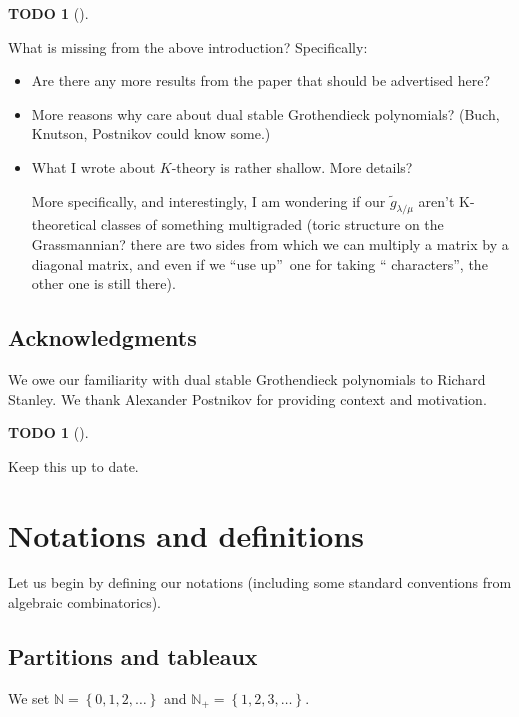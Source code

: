 \documentclass[numbers=enddot,12pt,final,onecolumn,notitlepage]{scrartcl}%
\theoremstyle{definition}
\newtheorem{quest}[theo]{TODO}
\newenvironment{todo}[1][]
{\begin{quest}[#1]\begin{leftbar}}
{\end{leftbar}\end{quest}}
\begin{document}
\begin{todo}
What is missing from the above introduction? Specifically:

\begin{itemize}
\item Are there any more results from the paper that should be advertised here?

\item More reasons why care about dual stable Grothendieck polynomials? (Buch,
Knutson, Postnikov could know some.)

\item What I wrote about $K$-theory is rather shallow. More details?

More specifically, and interestingly, I am wondering if our $\widetilde{g}%
_{\lambda/\mu}$ aren't K-theoretical classes of something multigraded (toric
structure on the Grassmannian? there are two sides from which we can multiply
a matrix by a diagonal matrix, and even if we \textquotedblleft use
up\textquotedblright\ one for taking \textquotedblleft
characters\textquotedblright, the other one is still there).
\end{itemize}
\end{todo}

\subsection{Acknowledgments}

We owe our familiarity with dual stable Grothendieck polynomials to Richard
Stanley. We thank Alexander Postnikov for providing context and motivation.

\begin{todo}
Keep this up to date.
\end{todo}

\section{\label{sect.notations}Notations and definitions}

Let us begin by defining our notations (including some standard conventions
from algebraic combinatorics).

\subsection{Partitions and tableaux}

We set $\mathbb{N}=\left\{  0,1,2,\ldots\right\}  $ and $\mathbb{N}%
_{+}=\left\{  1,2,3,\ldots\right\}  $. 
\end{document}
